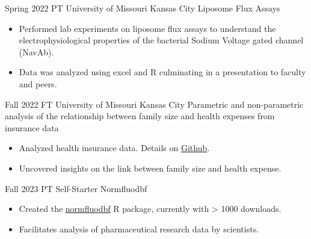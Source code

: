 \documentclass[
	10pt, %
]{FreemanCV_MOD}
\begin{document}
\begin{paracol}{2}





\projectentry
	{Spring 2022} %
	{PT} %
	{University of Missouri Kansas City} %
	{Liposome Flux Assays } %
	\projectdetails
	\begin{itemize}
	\item Performed lab experiments on liposome flux assays to understand the electrophysiological properties of the bacterial Sodium Voltage gated channel (NavAb).
	\item Data was analyzed using excel and R culminating in a presentation to faculty and peers.
	 \end{itemize}
	 
\projectentry
	{Fall 2022} %
	{FT} %
	{University of Missouri Kansas City} %
	{Parametric and non-parametric analysis of the relationship between family size and health expenses from insurance data} %
	\projectdetails
	\begin{itemize}
	\item Analyzed health insurance data. Details on \href{https://github.com/AlphaPrime7/Health_Insurance_Project_SAS}{Github}.
	\item Uncovered insights on the link between family size and health expense.
	\end{itemize}


\projectentry
	{Fall 2023} %
	{PT} %
	{Self-Starter} %
	{Normfluodbf} %
	\projectdetails
	\begin{itemize}
	\item Created the \href{https://www.cran-e.com/package/normfluodbf}{normfluodbf} R package, currently with > 1000 downloads.
	\item Facilitates analysis of pharmaceutical research data by scientists.
	\end{itemize}


\end{paracol}
\end{document}
